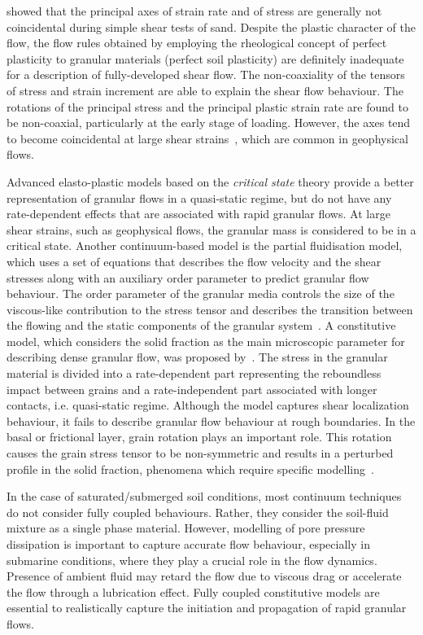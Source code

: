 \citet{Roscoe1970} showed that the principal axes of strain rate and of 
stress are generally not coincidental during simple shear tests of sand. 
Despite 
the plastic character of the flow, the flow rules obtained by employing the 
rheological concept of perfect plasticity to granular materials (perfect soil 
plasticity) are definitely inadequate for a description of fully-developed 
shear flow. The non-coaxiality of the tensors of stress and strain increment 
are able to explain the shear flow behaviour. The rotations of the principal 
stress 
and the principal plastic strain rate are found to be non-coaxial, particularly 
at the early stage of loading. However, the axes tend 
to become coincidental at large shear strains~\citep{Yu2006}, which are common 
in geophysical flows.

Advanced elasto-plastic models based on the \textit{critical state} theory
provide a better representation of granular flows in a quasi-static regime, but 
do not have any rate-dependent effects that are associated with rapid granular 
flows. At large shear strains, such as geophysical flows, the granular mass is 
considered to be in a critical state. Another continuum-based model is the 
partial fluidisation model, which uses a set of equations that describes the 
flow velocity and the shear stresses along with an auxiliary order parameter to 
predict granular flow behaviour. The order parameter of the granular media 
controls the size of the viscous-like contribution to the stress tensor and 
describes the transition between the flowing and the static components of the 
granular system~\citep{Aranson2001}. A constitutive model, which considers the 
solid fraction as the main microscopic parameter for describing dense granular 
flow, was proposed by~\citet{Josserand2004}. The stress in the granular 
material 
is divided into a rate-dependent part representing the reboundless impact 
between grains and a rate-independent part associated with longer contacts, 
i.e. quasi-static regime. Although the model captures shear localization 
behaviour, it fails to describe granular flow behaviour at rough 
boundaries. In the basal or frictional layer, grain rotation plays an 
important role. This rotation causes the grain stress tensor to be 
non-symmetric and 
results in a perturbed profile in the solid fraction, phenomena which require 
specific  
modelling~\citep{Josserand2004}.

In the case of saturated/submerged soil conditions, most continuum 
techniques do not consider fully coupled behaviours. Rather, they consider 
the soil-fluid mixture as a single phase material. However, modelling of pore 
pressure dissipation is important to capture accurate flow behaviour, 
especially in submarine conditions, where they play a crucial role in the flow 
dynamics. Presence of ambient fluid may retard the flow due to viscous drag or 
accelerate the flow through a lubrication effect. Fully coupled constitutive 
models are essential to realistically capture the initiation and propagation of 
rapid granular flows.

